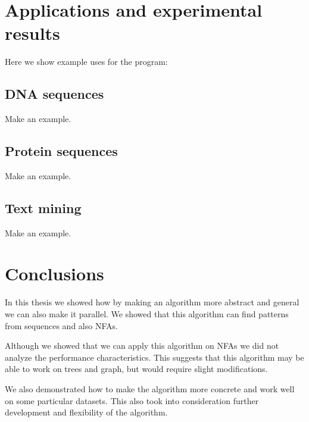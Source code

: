 \chapter{Applications and experimental results}

Here we show example uses for the program:

\section{DNA sequences}

Make an example.

\section{Protein sequences}

Make an example.

\section{Text mining}

Make an example.







\chapter{Conclusions}

In this thesis we showed how by making an algorithm more abstract and
general we can also make it parallel. We showed that this algorithm
can find patterns from sequences and also NFAs.

Although we showed that we can apply this algorithm on NFAs we did
not analyze the performance characteristics. This suggests that 
this algorithm may be able to work on trees and graph, but
would require slight modifications.

We also demonstrated how to make the algorithm more concrete 
and work well on some particular datasets. This also took into 
consideration further development and flexibility of the algorithm.


